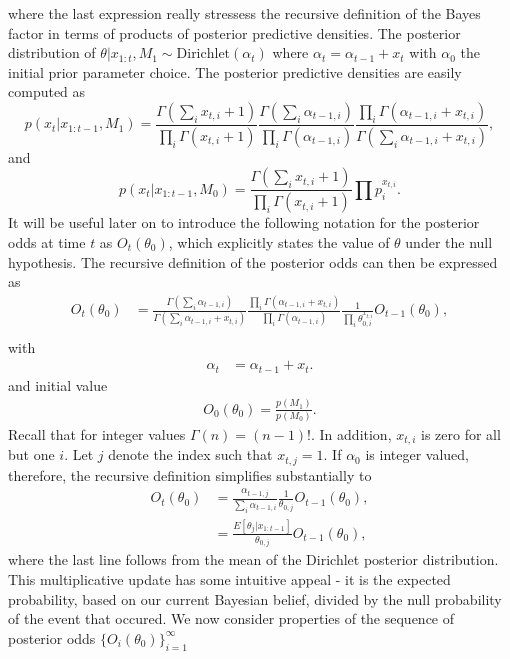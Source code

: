 \documentclass[11pt]{article}
\begin{document}
where the last expression really stressess the recursive definition of the Bayes factor in terms of products of posterior predictive densities. The posterior distribution of $\theta| x_{1:t}, M_1 \sim \text{Dirichlet}(\alpha_t)$ where $\alpha_t = \alpha_{t-1}+x_t$ with $\alpha_0$ the initial prior parameter choice. The posterior predictive densities are easily computed as
\begin{equation}
  \label{eq:posterior_predictive_m1}
   p(x_t|x_{1:t-1},M_1) = \frac{ \Gamma(\sum_i x_{t,i}+ 1)}{\prod_i \Gamma(x_{t,i} + 1)} \frac{\Gamma(\sum_i \alpha_{t-1,i})}{\prod_i \Gamma(\alpha_{t-1,i})} \frac{\prod_i \Gamma(\alpha_{t-1,i} + x_{t,i})}{\Gamma(\sum_i \alpha_{t-1,i} + x_{t,i})},
\end{equation}
and
\begin{equation}
  \label{eq:posterior_predictive_m2}
   p(x_t|x_{1:t-1},M_0) = \frac{ \Gamma(\sum_i x_{t,i} + 1)}{\prod_i \Gamma(x_{t,i} + 1)} \prod p_i^{x_{t,i}}.
 \end{equation}
 It will be useful later on to introduce the following notation for the posterior odds at time $t$ as $O_t(\theta_0)$, which explicitly states the value of $\theta$ under the null hypothesis. The recursive definition of the posterior odds can then be expressed as
\begin{align}
  O_{t}(\theta_0) &= \frac{\Gamma(\sum_i \alpha_{t-1,i})}{\Gamma(\sum_i \alpha_{t-1,i} +  x_{t,i})} \frac{\prod_i \Gamma(\alpha_{t-1,i} + x_{t,i})}{\prod_i \Gamma(\alpha_{t-1,i})} \frac{1}{\prod_i \theta_{0,i}^{x_{t,i}}}  O_{t-1}(\theta_0),\\
\end{align}
with
\begin{align}
  \label{eq:alpha_update}
  \alpha_{t}&= \alpha_{t-1}+x_t.
\end{align}
and initial value
\begin{align}
  \label{eq:bayes_factor_seed}
O_0(\theta_0) = \frac{p(M_1)}{p(M_0)}.
\end{align}
Recall that for integer values $\Gamma(n)=(n-1)!$. In addition, $x_{t,i}$ is zero for all but one $i$. Let $j$ denote the index such that $x_{t,j}=1$. If $\alpha_0$ is integer valued, therefore, the recursive definition simplifies substantially to
\begin{align}
  \label{eq:simplified_bayes_factor}
  O_{t}(\theta_0) &= \frac{\alpha_{t-1,j}}{\sum_i \alpha_{t-1,i}} \frac{1}{\theta_{0,j}} O_{t-1}(\theta_0),\\
  &=\frac{E[\theta_j|x_{1:t-1}]}{\theta_{0,j}}  O_{t-1}(\theta_0),
\end{align}
where the last line follows from the mean of the Dirichlet posterior distribution. This multiplicative update has some intuitive appeal - it is the expected probability, based on our current Bayesian belief, divided by the null probability of the event that occured. We now consider properties of the sequence of posterior odds $\lbrace O_{i}(\theta_0) \rbrace_{i=1}^\infty $
\end{document}
